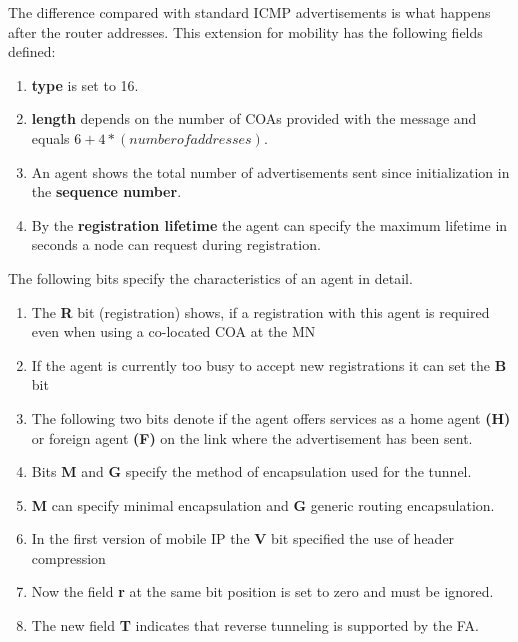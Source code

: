 The difference compared with standard ICMP advertisements is what happens after the router addresses. This extension for mobility has the following
fields defined:

\begin{multicols}{2}
	\begin{enumerate}
		\item \textbf{type} is set to 16.
		
		\item \textbf{length} depends on the number of COAs provided with the message and equals $ 6 + 4*(number of addresses) $.
		
		\item An agent shows the total number of advertisements sent since initialization in the \textbf{sequence number}.
		
		\item By the \textbf{registration lifetime} the agent can specify the maximum lifetime in seconds a node can request during registration.
	\end{enumerate}
\end{multicols}


The following bits specify the characteristics of an agent in detail.
	
	\begin{multicols}{2}
			\begin{enumerate}
			\item The \textbf{R} bit (registration) shows, if a registration with this agent is required even when using a co-located COA at the MN
			
			\item If the agent is currently too busy to accept new registrations it can set the \textbf{B} bit
			
			\item The following two bits denote if the agent offers services as a home agent \textbf{(H)} or foreign agent \textbf{(F)} on the link where the advertisement has been sent.
			
			\item Bits \textbf{M} and \textbf{G} specify the method of encapsulation used for the tunnel.
			
			\item \textbf{M} can specify minimal encapsulation and \textbf{G} generic routing encapsulation.
			
			\item In the first version of mobile IP the \textbf{V} bit specified the use of header compression
			
			\item Now the field \textbf{r} at the same bit position is set to zero and must be ignored.
			
			\item The new field \textbf{T} indicates that reverse tunneling is supported by the FA.
		\end{enumerate}
	\end{multicols}


